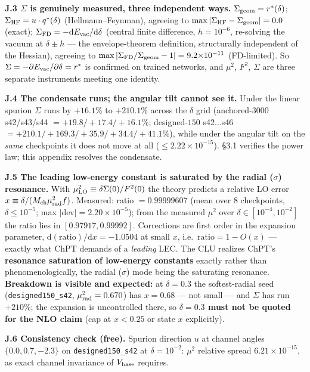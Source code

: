 \documentclass[10pt]{article}
\begin{document}
\textbf{J.3 $\Sigma$ is genuinely measured, three independent ways.} $\Sigma_{\rm geom}=r^*(\delta)$; $\Sigma_{\rm HF}=u\cdot q^*(\delta)$ (Hellmann--Feynman), agreeing to $\max|\Sigma_{\rm HF}-\Sigma_{\rm geom}|=0.0$ (exact); $\Sigma_{\rm FD}=-\mathrm{d}E_{\rm vac}/\mathrm{d}\delta$ (central finite difference, $h{=}10^{-6}$, re-solving the vacuum at $\delta\pm h$ --- the envelope-theorem definition, structurally independent of the Hessian), agreeing to $\max|\Sigma_{\rm FD}/\Sigma_{\rm geom}-1|=9.2{\times}10^{-11}$ (FD-limited). So $\Sigma=-\partial E_{\rm vac}/\partial\delta=r^*$ is confirmed on trained networks, and $\mu^2$, $F^2$, $\Sigma$ are three separate instruments meeting one identity.

\textbf{J.4 The condensate runs; the angular tilt cannot see it.} Under the linear spurion $\Sigma$ runs by $+16.1\%$ to $+210.1\%$ across the $\delta$ grid (anchored-$3000$ s42/s43/s44 $=+19.8/+17.4/+16.1\%$; designed-$150$ s42$\ldots$s46 $=+210.1/+169.3/+35.9/+34.4/+41.1\%$), while under the angular tilt on the \emph{same} checkpoints it does not move at all ($\le2.22{\times}10^{-15}$). \S3.1 verifies the power law; this appendix resolves the condensate.

\textbf{J.5 The leading low-energy constant is saturated by the radial ($\sigma$) resonance.} With $\mu^2_{\rm LO}\equiv\delta\Sigma(0)/F^2(0)$ the theory predicts a relative LO error $x\equiv\delta/(M_{\rm ch}\mu_{\rm rad}^2f)$. Measured: ratio $=0.99999607$ (mean over $8$ checkpoints, $\delta\le10^{-5}$; max $|$dev$|=2.20{\times}10^{-5}$); from the measured $\mu^2$ over $\delta\in[10^{-4},10^{-2}]$ the ratio lies in $[0.97917,0.99992]$. Corrections are first order in the expansion parameter, $\mathrm{d}(\text{ratio})/\mathrm{d}x=-1.0504$ at small $x$, i.e.\ $\text{ratio}=1-O(x)$ --- exactly what ChPT demands of a \emph{leading} LEC. The CLU realizes ChPT's \textbf{resonance saturation of low-energy constants} exactly rather than phenomenologically, the radial ($\sigma$) mode being the saturating resonance. \textbf{Breakdown is visible and expected:} at $\delta=0.3$ the softest-radial seed (\texttt{designed150\_s42}, $\mu_{\rm rad}^2=0.670$) has $x=0.68$ --- not small --- and $\Sigma$ has run $+210\%$; the expansion is uncontrolled there, so \textbf{$\delta=0.3$ must not be quoted for the NLO claim} (cap at $x<0.25$ or state $x$ explicitly).

\textbf{J.6 Consistency check (free).} Spurion direction $u$ at channel angles $\{0.0,0.7,-2.3\}$ on \texttt{designed150\_s42} at $\delta{=}10^{-2}$: $\mu^2$ relative spread $6.21{\times}10^{-15}$, as exact channel invariance of $V_{\rm base}$ requires.
\end{document}
